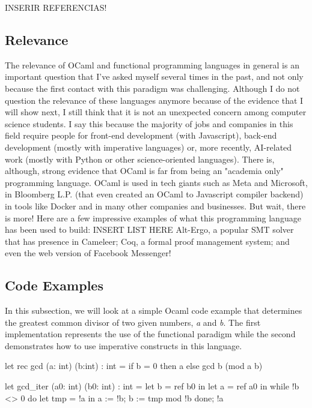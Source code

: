 {INSERIR REFERENCIAS!

\subsection{Relevance} 
\label{sub:relevance}

The relevance of OCaml and functional programming languages in general is an important question that I've asked myself several times in the past, and not only because the first contact with this paradigm was challenging.
Although I do not question the relevance of these languages anymore because of the evidence that I will show next, I still think that it is not an unexpected concern among computer science students.
I say this because the majority of jobs and companies in this field require people for front-end development (with Javascript), back-end development (mostly with imperative languages) or, more recently, AI-related work (mostly with Python or other science-oriented languages).
There is, although, strong evidence that OCaml is far from being an "academia only" programming language.
OCaml is used in tech giants such as Meta and Microsoft, in Bloomberg L.P. (that even created an OCaml to Javascript compiler backend) in tools like Docker and in many other companies and businesses.
But wait, there is more! Here are a few impressive examples of what this programming language has been used to build: INSERT LIST HERE
Alt-Ergo, a popular SMT solver that has presence in Cameleer;
Coq, a formal proof management system;
and even the web version of Facebook Messenger!

\subsection{Code Examples} 
\label{sub:examples_ocaml}

In this subsection, we will look at a simple Ocaml code example that determines the greatest common divisor of two given numbers, \emph{a} and \emph{b}.
The first implementation represents the use of the functional paradigm while the second demonstrates how to use imperative constructs in this language.

\begin{ocamlsmall}
  let rec gcd (a: int) (b:int) : int =
      if b = 0 then a
      else gcd b (mod a b) 
\end{ocamlsmall}

\begin{ocamlsmall}
  let gcd_iter (a0: int) (b0: int) : int =
      let b = ref b0 in
      let a = ref a0 in
      while !b <> 0 do
          let tmp = !a in
          a := !b;
          b := tmp mod !b
      done;
      !a
\end{ocamlsmall}

}
